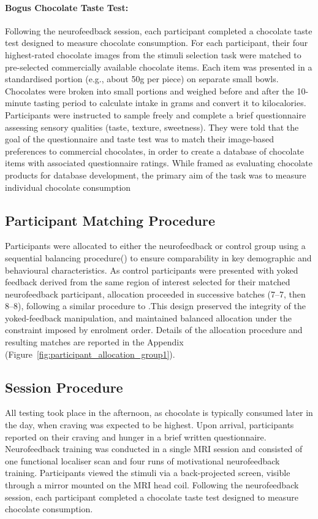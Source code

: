 \documentclass[]{imag-ms-template}
\begin{document}
\paragraph{Bogus Chocolate Taste Test:} Following the neurofeedback session, each participant completed a chocolate taste test designed to measure chocolate consumption. For each participant, their four highest-rated chocolate images from the stimuli selection task were matched to pre-selected commercially available chocolate items. Each item was presented in a standardised portion (e.g., about 50g per piece) on separate small bowls. Chocolates were broken into small portions and weighed before and after the 10-minute tasting period to calculate intake in grams and convert it to kilocalories. Participants were instructed to sample freely and complete a brief questionnaire assessing sensory qualities (taste, texture, sweetness). They were told that the goal of the questionnaire and taste test was to match their image-based preferences to commercial chocolates, in order to create a database of chocolate items with associated questionnaire ratings. While framed as evaluating chocolate products for database development, the primary aim of the task was to measure individual chocolate consumption

\subsection{Participant Matching Procedure}
Participants were allocated to either the neurofeedback or control group using a sequential balancing procedure(\cite{bormSequentialBalancingSimple2005}) to ensure comparability in key demographic and behavioural characteristics. As control participants were presented with yoked feedback derived from the same region of interest selected for their matched neurofeedback participant, allocation proceeded in successive batches (7–7, then 8–8), following a similar procedure to \cite{hamiltonEffectsSaliencenetworknodeNeurofeedback2016}.This design preserved the integrity of the yoked-feedback manipulation, and maintained balanced allocation under the constraint imposed by enrolment order. Details of the allocation procedure and resulting matches are reported in the Appendix (Figure~\ref{fig:participant_allocation_group1}).

\subsection{Session Procedure}
All testing took place in the afternoon, as chocolate is typically consumed later in the day, when craving was expected to be highest. Upon arrival, participants reported on their craving and hunger in a brief written questionnaire. Neurofeedback training was conducted in a single MRI session and consisted of one functional localiser scan and four runs of motivational neurofeedback training. Participants viewed the stimuli via a back-projected screen, visible through a mirror mounted on the MRI head coil. Following the neurofeedback session, each participant completed a chocolate taste test designed to measure chocolate consumption.
\end{document}
